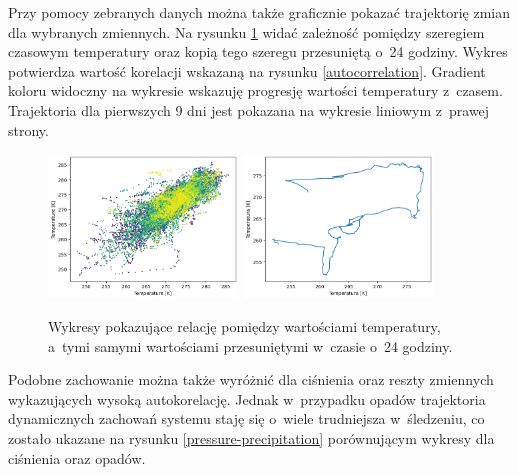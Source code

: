 Przy pomocy zebranych danych można także graficznie pokazać trajektorię zmian dla wybranych zmiennych. Na rysunku \ref{temperature} widać zależność pomiędzy szeregiem czasowym temperatury
oraz kopią tego szeregu przesuniętą o~24 godziny. Wykres potwierdza wartość korelacji 
wskazaną na rysunku \ref{autocorrelation}. Gradient koloru widoczny na wykresie wskazuję
progresję wartości temperatury z~czasem. Trajektoria dla pierwszych 9 dni jest pokazana 
na wykresie liniowym z~prawej strony. 

\begin{figure}[H]
    \centering
    \includegraphics[width=0.45\textwidth]{images/temperature_scatter.png}
    \includegraphics[width=0.45\textwidth]{images/temperature_line.png}
    \caption{Wykresy pokazujące relację pomiędzy wartościami temperatury, a~tymi samymi 
    wartościami przesuniętymi w~czasie o~24 godziny.}
    \label{temperature}
\end{figure}

Podobne zachowanie można także wyróżnić dla ciśnienia oraz reszty zmiennych wykazujących 
wysoką autokorelację. Jednak w~przypadku opadów trajektoria dynamicznych zachowań systemu
staję się o~wiele trudniejsza w~śledzeniu, co zostało ukazane na rysunku \ref{pressure-precipitation} porównującym wykresy dla ciśnienia oraz opadów. 


